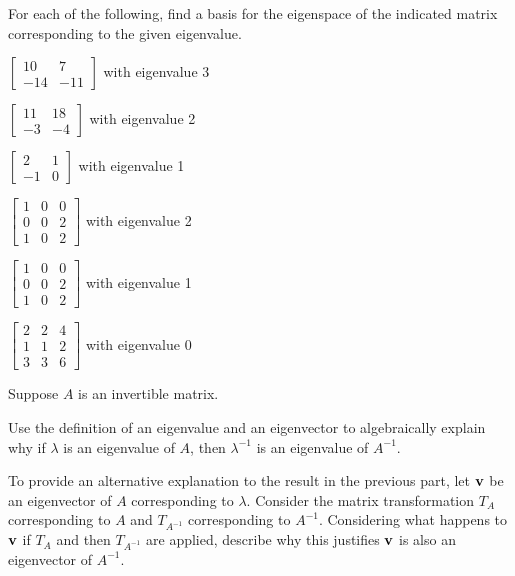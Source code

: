 \label{sec:egspace_exer}
\be
\item For each of the following, find a basis for the eigenspace of the indicated matrix corresponding to the given eigenvalue.
	\ba
	\item $\left[ \begin{array}{rr} 10&7 \\ -14&-11 \end{array} \right]$ with eigenvalue 3
	\item  $\left[ \begin{array}{rr} 11&18 \\ -3&-4 \end{array} \right]$ with eigenvalue 2
	\item $\left[ \begin{array}{rc} 2&1 \\ -1&0 \end{array} \right]$ with eigenvalue 1
	\item $\left[ \begin{array}{ccc} 1&0&0 \\ 0&0&2 \\ 1&0&2 \end{array} \right]$ with eigenvalue 2
	\item $\left[ \begin{array}{ccc} 1&0&0 \\ 0&0&2 \\ 1&0&2 \end{array} \right]$ with eigenvalue 1
	\item $\left[ \begin{array}{ccc} 2&2&4 \\ 1&1&2 \\ 3&3&6 \end{array} \right]$ with eigenvalue 0
	\ea

\item Suppose $A$ is an invertible matrix. 

	\ba 
	\item Use the definition of an eigenvalue and an eigenvector to algebraically explain why if $\lambda$ is an eigenvalue of $A$, then $\lambda^{-1}$ is an eigenvalue of $A^{-1}$. 

	\item To provide an alternative explanation to the result in the previous part, let $\mathbf{v}$ be an eigenvector of $A$ corresponding to $\lambda$. Consider the matrix transformation $T_A$ corresponding to $A$ and $T_{A^{-1}}$ corresponding to $A^{-1}$. Considering what happens to $\mathbf{v}$ if $T_A$ and then $T_{A^{-1}}$ are applied, describe why this justifies $\mathbf{v}$ is also an eigenvector of $A^{-1}$.
	\ea

